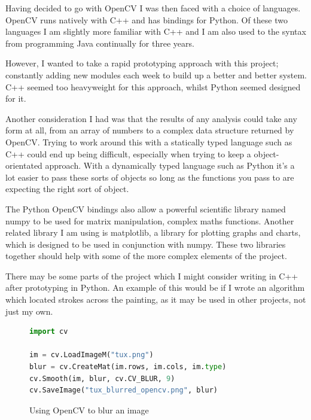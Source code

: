 \documentclass[11pt,fleqn,twoside]{article}
\begin{document}
Having decided to go with OpenCV I was then faced with a choice of languages. OpenCV runs natively
with C++ and has bindings for Python. Of these two languages I am slightly more familiar with C++ 
and I am also used to the syntax from programming Java continually for three years. 

However, I wanted to take a rapid prototyping approach with this project; constantly adding new 
modules each week to build up a better and better system. C++ seemed too heavyweight for this 
approach, whilst Python seemed designed for it.

Another consideration I had was that the results of any analysis could take any form at all, from
an array of numbers to a complex data structure returned by OpenCV. Trying to work around this with
a statically typed language such as C++ could end up being difficult, especially when trying to 
keep a object-orientated approach. With a dynamically typed language such as Python it's a lot 
easier to pass these sorts of objects so long as the functions you pass to are expecting the right 
sort of object.

The Python OpenCV bindings also allow a powerful scientific library named numpy to be used for
matrix manipulation, complex maths functions. Another related library I am using is matplotlib, a
library for plotting graphs and charts, which is designed to be used in conjunction with numpy. 
These two libraries together should help with some of the more complex elements of the project.

There may be some parts of the project which I might consider writing in C++ after prototyping in 
Python. An example of this would be if I wrote an algorithm which located strokes across the 
painting, as it may be used in other projects, not just my own.


\begin{figure}[p]
\begin{lstlisting}[language=Python]
import cv

im = cv.LoadImageM("tux.png")
blur = cv.CreateMat(im.rows, im.cols, im.type)
cv.Smooth(im, blur, cv.CV_BLUR, 9)
cv.SaveImage("tux_blurred_opencv.png", blur)
\end{lstlisting}
\caption{Using OpenCV to blur an image}
\label{fig:opencv}
\end{figure}
\end{document}
